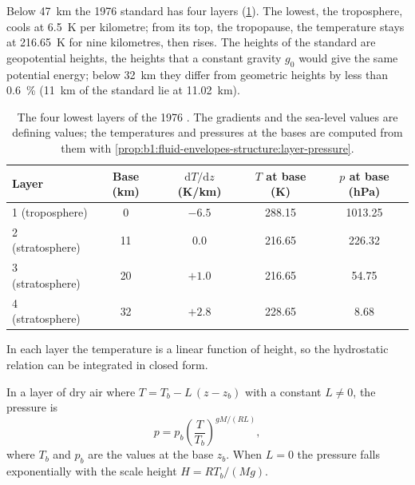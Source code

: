 Below \qty{47}{km} the 1976 standard has four layers
(\cref{tab:b1:fluid-envelopes-structure:layers}). The lowest, the troposphere,
cools at \qty{6.5}{K} per kilometre; from its top, the tropopause, the
temperature stays at \qty{216.65}{K} for nine kilometres, then rises. The
heights of the standard are geopotential heights, the heights that a constant
gravity $g_0$ would give the same potential energy; below \qty{32}{km} they
differ from geometric heights by less than \qty{0.6}{\percent}
(\qty{11}{km} of the standard lie at \qty{11.02}{km}).

\begin{table}[ht]
\centering
\small
\renewcommand{\arraystretch}{1.2}
\begin{tabular}{|l|c|c|c|c|}
\hline
Layer & Base (km) & $\mathrm dT/\mathrm dz$ (K/km) & $T$ at base (K) & $p$ at base (hPa) \\
\hline
1 (troposphere) & 0 & $-6.5$ & 288.15 & 1013.25 \\
2 (stratosphere) & 11 & 0.0 & 216.65 & 226.32 \\
3 (stratosphere) & 20 & $+1.0$ & 216.65 & 54.75 \\
4 (stratosphere) & 32 & $+2.8$ & 228.65 & 8.68 \\
\hline
\end{tabular}
\caption{The four lowest layers of the 1976 . The gradients
and the sea-level values are defining values; the temperatures and pressures at
the bases are computed from them with \cref{prop:b1:fluid-envelopes-structure:layer-pressure}.}
\label{tab:b1:fluid-envelopes-structure:layers}
\end{table}

In each layer the temperature is a linear function of height, so the
hydrostatic relation can be integrated in closed form.

\begin{proposition}\label{prop:b1:fluid-envelopes-structure:layer-pressure}
In a layer of dry air where $T = T_b - L\,(z - z_b)$ with a constant $L \neq 0$, the
pressure is
\[
  p = p_b \left(\frac{T}{T_b}\right)^{gM/(RL)},
\]
where $T_b$ and $p_b$ are the values at the base $z_b$. When $L = 0$ the
pressure falls exponentially with the scale height $H = RT_b/(Mg)$.
\end{proposition}

